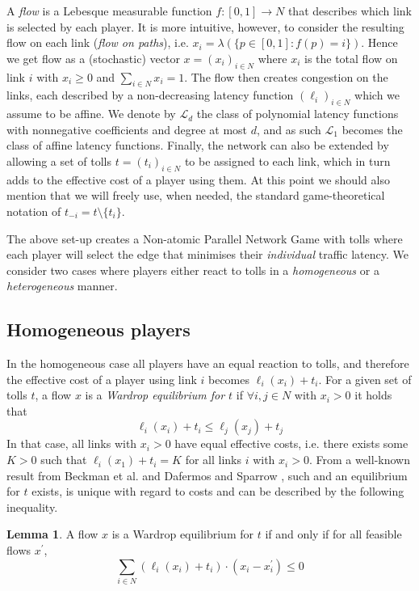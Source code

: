 \documentclass[10pt,a4paper]{book}
\theoremstyle{definition}
\newtheorem{lemma}[definition]{Lemma}
\theoremstyle{comment}
\begin{document}
A \textit{flow} is a Lebesque measurable function $f: [0, 1] \rightarrow N$ that describes which link is selected by each player.
It is more intuitive, however, to consider the resulting flow on each link (\textit{flow on paths}), i.e. $x_i = \lambda(\{p \in [0, 1]: f(p) = i\})$.
Hence we get flow as a (stochastic) vector $x = (x_i)_{i \in N}$ where $x_i$ is the total flow on link $i$ with $x_i \geq 0$ and $\sum_{i \in N}x_i = 1$.
The flow then creates congestion on the links, each described by a non-decreasing latency function $(\ell_i)_{i \in N}$ which we assume to be affine.
We denote by $\mathcal{L}_d$ the class of polynomial latency functions with nonnegative coefficients and degree at most $d$, and as such $\mathcal{L}_1$ becomes the class of affine latency functions.
Finally, the network can also be extended by allowing a set of tolls $t = (t_i)_{i \in N}$ to be assigned to each link, which in turn adds to the effective cost of a player using them.
At this point we should also mention that we will freely use, when needed, the standard game-theoretical notation of $t_{-i} = t \setminus \{t_i\}$.

The above set-up creates a Non-atomic Parallel Network Game with tolls where each player will select the edge that minimises their \textit{individual} traffic latency.
We consider two cases where players either react to tolls in a \textit{homogeneous} or a \textit{heterogeneous} manner.

\subsection*{Homogeneous players}

In the homogeneous case all players have an equal reaction to tolls, and therefore the effective cost of a player using link $i$ becomes $\ell_i(x_i) + t_i$.
For a given set of tolls $t$, a flow $x$ is a \textit{Wardrop equilibrium for $t$} if $\forall i, j \in N$ with $x_i > 0$ it holds that
\begin{equation*}
	\ell_i(x_i) + t_i \leq \ell_j(x_j) + t_j
\end{equation*}
In that case, all links with $x_i > 0$ have equal effective costs, i.e. there exists some $K > 0$ such that $\ell_i(x_1) + t_i = K$ for all links $i$ with $x_i > 0$.
From a well-known result from Beckman et al. \cite{beckmann1956studies} and Dafermos and Sparrow \cite{1363388843888284416}, such and an equilibrium for $t$ exists, is unique with regard to costs and can be described by the following inequality.
\begin{lemma}
	\label{lemma:wardrop_equilibrium}
	A flow $x$ is a Wardrop equilibrium for $t$ if and only if for all feasible flows $x^\prime$,
	\[\sum_{i \in N} (\ell_i(x_i) + t_i) \cdot (x_i - x_i^\prime) \leq 0\]
\end{lemma}
\end{document}
